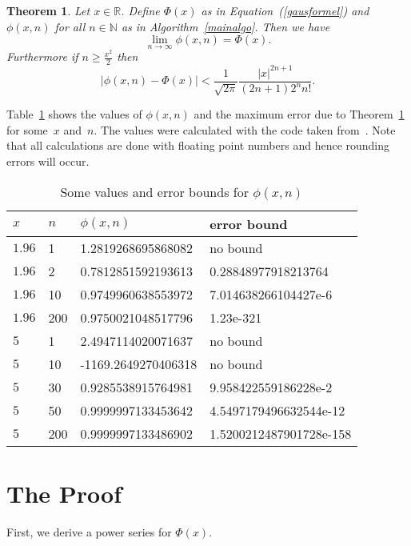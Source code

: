 \documentclass{article}
\newtheorem{theorem}[algorithm]{Theorem}
\newcommand\Nset{\mathbb N}
\begin{document}
\begin{theorem}\label{algotheorem}
Let $x\in{\mathbb R}$. Define $\Phi(x)$ as in
Equation~(\ref{gausformel}) and $\phi(x,n)$ for all $n\in\Nset$ as in
Algorithm~\ref{mainalgo}. Then we have
\begin{equation*}\lim_{n\to\infty}\phi(x,n)=\Phi(x).\end{equation*}
Furthermore if $n\ge\frac{x^2}{2}$ then
\begin{equation*}\left|\phi(x,n)-\Phi(x)\right|<\frac{1}{\sqrt{2\pi}}\frac{|x|^{2n+1}}{(2n+1)2^nn!}.\end{equation*}
\end{theorem}

Table~\ref{somevalues} shows the values of $\phi(x,n)$ and the maximum
error due to Theorem~\ref{algotheorem} for some~$x$ and~$n$. The
values were calculated with the code taken from~\cite{github}. Note that
all calculations are done with floating point numbers and hence
rounding errors will occur.

\begin{table}[ht]
\begin{center}
\begin{tabular}{*{3}{l|}l}
$x$ & $n$ & $\phi(x,n)$ & error bound\\
\hline
$1.96$ & 1 & 1.2819268695868082 & no bound\\
$1.96$ & 2 & 0.7812851592193613 & 0.28848977918213764\\
$1.96$ & 10 & 0.9749960638553972 & 7.014638266104427e-6\\
$1.96$ & 200 & 0.9750021048517796 & 1.23e-321\\
$5$ & 1 & 2.4947114020071637 & no bound\\
$5$ & 10 & -1169.2649270406318 & no bound\\
$5$ & 30 & 0.9285538915764981 & 9.958422559186228e-2\\
$5$ & 50 & 0.9999997133453642 & 4.5497179496632544e-12\\
$5$ & 200 & 0.9999997133486902 & 1.5200212487901728e-158
\end{tabular}
\end{center}
\caption{Some values and error bounds for $\phi(x,n)$\label{somevalues}}
\end{table}

\section{The Proof}\label{secproof}
First, we derive a power series for $\Phi(x)$.
\end{document}
